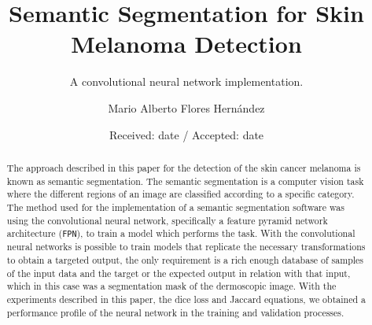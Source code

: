 \usepackage{pifont}%
	\newcommand{\cmark}{\color{green_matrix}\ding{51}}%
  \newcommand{\xmark}{\color{red}\ding{53}}%


%
%


\title{Semantic Segmentation for Skin Melanoma Detection%
}
\subtitle{A convolutional neural network implementation.}


\author{Mario Alberto Flores Hernández}


\date{Received: date / Accepted: date}


\maketitle

\begin{abstract}
  The approach described in this paper for the detection of the skin cancer melanoma is known as semantic segmentation. The semantic segmentation is a computer vision task where the different regions of an image are classified according to a specific category. The method used for the implementation of a semantic segmentation software was using the convolutional neural network, specifically a feature pyramid network architecture (\texttt{FPN}), to train a model which performs the task. With the convolutional neural networks is possible to train models that replicate the necessary transformations to obtain a targeted output, the only requirement is a rich enough database of samples of the input data and the target or the expected output in relation with that input, which in this case was a segmentation mask of the dermoscopic image. With the experiments described in this paper, the dice loss and Jaccard equations, we obtained a performance profile of the neural network in the training and validation processes.

\end{abstract}

